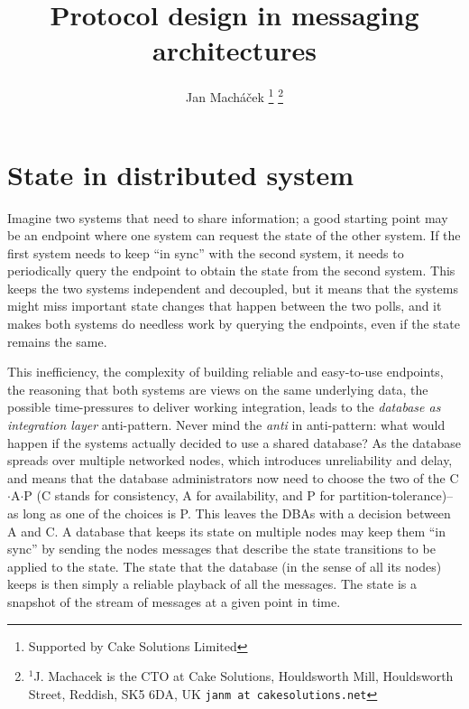 



\title{Protocol design in messaging architectures}

\author{Jan Mach{\'a}\v{c}ek%
\thanks{Supported by Cake Solutions Limited}%
\thanks{$^{1}$J. Machacek is the CTO at Cake Solutions, Houldsworth Mill, Houldsworth Street, Reddish, SK5 6DA, UK {\tt\small janm at cakesolutions.net}}%
}




\section{State in distributed system}
Imagine two systems that need to share information; a good starting point may be an endpoint where one system can request the state of the other system. If the first system needs to keep ``in sync'' with the second system, it needs to periodically query the endpoint to obtain the state from the second system. This keeps the two systems independent and decoupled, but it means that the systems might miss important state changes that happen between the two polls, and it makes both systems do needless work by querying the endpoints, even if the state remains the same.

This inefficiency, the complexity of building reliable and easy-to-use endpoints, the reasoning that both systems are views on the same underlying data, the possible time-pressures to deliver working integration, leads to the \emph{database as integration layer} anti-pattern\cite{eip}. Never mind the \emph{anti} in anti-pattern: what would happen if the systems actually decided to use a shared database? As the database spreads over multiple networked nodes, which introduces unreliability and delay, and means that the database administrators now need to choose the two of the C$\cdot$A$\cdot$P (C stands for consistency, A for availability, and P for partition-tolerance)--as long as one of the choices is P. This leaves the DBAs with a decision between A and C. A database that keeps its state on multiple nodes may keep them ``in sync'' by sending the nodes messages that describe the state transitions to be applied to the state. The state that the database (in the sense of all its nodes) keeps is then simply a reliable playback of all the messages. The state is a snapshot of the stream of messages at a given point in time.

